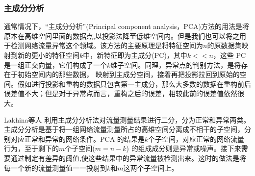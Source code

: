 \subsubsection{主成分分析}
通常情况下，“主成分分析”(Principal component analysis，PCA)方法的用法是将原本在高维空间里面的数据点,以投影法降至低维空间内。但是我们也可以将之用于检测网络流量异常这个领域。该方法的主要原理是将特征空间为$n$的原数据集映射到新的更小的特征空间$k$中，新特征即为主成分(PC)，其中$k<<n$，这些 PC是一组正交向量，它们构成了一个$k$维子空间。同理，异常点的判别方法，是将存在于初始空间内的那些数据， 映射到主成分空间，接着再把投影拉回到原始的空间。假如进行投影和重构的数据只包含第一主成分，那么大多数的数据在重构前后误差值不大；但是对于异常点而言，重构之后的误差，相较此前的误差值依然很大。


Lakhina等人\cite{lakhina2004diagnosing} 利用主成分分析法对流量测量结果进行二分，分为正常和异常两类。主成分分析是基于将一组网络流量测量所占的高维空间分离成不相干的子空间，分别对应正常和异常的网络条件。PCA 的结果是$k$个子空间，对应正常的网络流量行为，至于剩下的$m$个子空间($m=n-k$) 的组成成分则是异常或噪声。接下来需要通过制定有差异的阈值,使这些结果中的异常流量被检测出来。这时的做法是将每一个新的流量测量值一一投射到$k$和$m$这两个子空间上。




